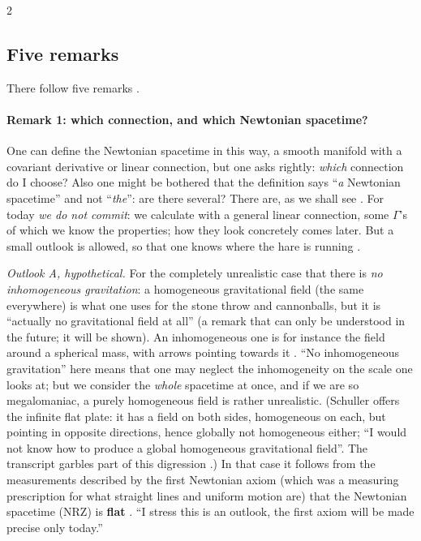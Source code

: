 \begin{paracol}{2}
\subsection{Five remarks}\label{ssec:nk-remarks}

There follow five remarks .

\paragraph{Remark 1: which connection, and which Newtonian spacetime?}
One can define the Newtonian spacetime in this way, a smooth manifold with a covariant derivative or linear connection, but one asks rightly: \emph{which}
connection do I choose? Also one might be bothered that the definition says ``\emph{a} Newtonian spacetime'' and not ``\emph{the}'': are there several?
There are, as we shall see . For today \emph{we do not commit}: we calculate with a general linear connection, some
$\Gamma$'s of which we know the properties; how they look concretely comes later. But a small outlook is allowed, so that one knows where the hare is running
.

\emph{Outlook A, hypothetical.} For the completely unrealistic case that there is \emph{no inhomogeneous gravitation}: a homogeneous gravitational field (the same everywhere) is what one
uses for the stone throw and cannonballs, but it is ``actually no gravitational field at all'' (a remark that can only be understood in the future; it will be shown).
An inhomogeneous one is for instance the field around a spherical mass, with arrows pointing towards it .
``No inhomogeneous gravitation'' here means that one may neglect the inhomogeneity on the scale one looks at; but we consider the \emph{whole}
spacetime at once, and if we are so megalomaniac, a purely homogeneous field is rather unrealistic. (Schuller offers the infinite flat plate: it has a field on both sides,
homogeneous on each, but pointing in opposite directions, hence globally not homogeneous either; ``I would not know how to produce a global homogeneous gravitational
field''. The transcript garbles part of this digression .) In that case it follows from the measurements described by the first Newtonian axiom
(which was a measuring prescription for what straight lines and uniform motion are) that the Newtonian spacetime (NRZ) is \textbf{flat}
. ``I stress this is an outlook, the first axiom will be made precise only today.''


\end{paracol}

